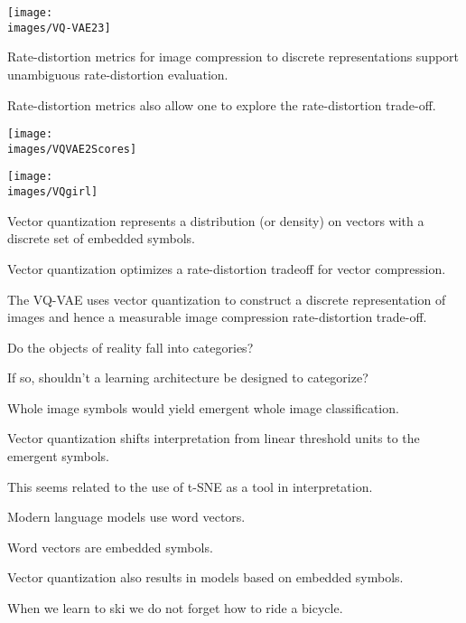 {\vfill
\centerline{\texttt{[image: \\images/VQ-VAE23]}}


Rate-distortion metrics for image compression to discrete representations support unambiguous rate-distortion evaluation.

\vfill
Rate-distortion metrics also allow one to explore the rate-distortion trade-off.

\vfill
\centerline{\texttt{[image: \\images/VQVAE2Scores]}}


\vfill
\centerline{\texttt{[image: \\images/VQgirl]}}



Vector quantization represents a distribution (or density) on vectors with a discrete set of embedded symbols.

\vfill
Vector quantization optimizes a rate-distortion tradeoff for vector compression.

\vfill
The VQ-VAE uses vector quantization to construct a discrete representation of images and hence a measurable image compression rate-distortion trade-off.


Do the objects of reality fall into categories?

\vfill
If so, shouldn't a learning architecture be designed to categorize?

\vfill
Whole image symbols would yield emergent whole image classification.


Vector quantization shifts interpretation from linear threshold units to the emergent symbols.

\vfill
This seems related to the use of t-SNE as a tool in interpretation.



Modern language models use word vectors.

\vfill
Word vectors are embedded symbols.

\vfill
Vector quantization also results in models based on embedded symbols.

When we learn to ski we do not forget how to ride a bicycle.

}
